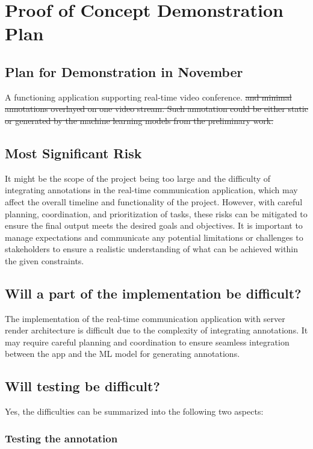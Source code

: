\documentclass{article}
\begin{document}
\section{Proof of Concept Demonstration Plan}

\subsection{Plan for Demonstration in November}

A functioning application supporting real-time video conference. \st{and minimal
  annotations overlayed on one video stream. Such annotation could be either
  static or generated by the machine learning models from the preliminary work.}

\subsection{Most Significant Risk}

It might be the scope of the project being too large and the difficulty of
integrating annotations in the real-time communication application, which may
affect the overall timeline and functionality of the project. However, with
careful planning, coordination, and prioritization of tasks, these risks can be
mitigated to ensure the final output meets the desired goals and objectives. It
is important to manage expectations and communicate any potential limitations or
challenges to stakeholders to ensure a realistic understanding of what can be
achieved within the given constraints.

\subsection{Will a part of the implementation be difficult?}

The implementation of the real-time communication application with server render
architecture is difficult due to the complexity of integrating annotations. It
may require careful planning and coordination to ensure seamless integration
between the app and the ML model for generating annotations.

\subsection{Will testing be difficult?}

Yes, the difficulties can be summarized into the following two aspects:

\subsubsection{Testing the annotation}
\end{document}
